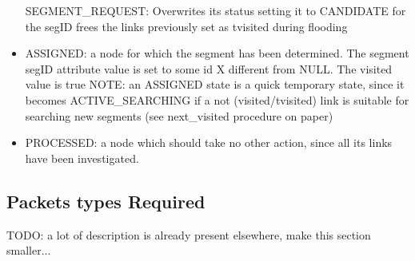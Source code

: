 \documentclass[final,journal,letterpaper]{IEEEtran}
\begin{document}
\begin{itemize}
SEGMENT\_REQUEST: Overwrites its status setting it to CANDIDATE for the
segID frees the links previously set as tvisited during flooding
\item{ASSIGNED}: a node for which the segment has been determined.  The
segment segID attribute value is set to some id X different from NULL.
The visited value is true NOTE: an ASSIGNED state is a quick temporary
state, since it becomes ACTIVE\_SEARCHING if a not (visited/tvisited)
link is suitable for searching new segments (see next\_visited
procedure on paper) 
\item{PROCESSED}: a node which should take no other
action, since all its links have been investigated. 
\end{itemize}

\subsection{Packets types Required}
TODO: a lot of description is already present elsewhere, make this
section smaller...
\end{document}
